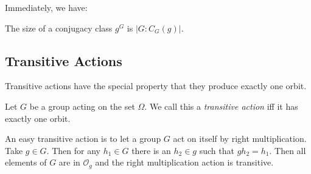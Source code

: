\documentclass[main.tex]{subfiles}
\begin{document}
Immediately, we have:

\begin{corollary}
The size of a conjugacy class $g^G$ is $|G : C_G(g)|$.
\end{corollary}


\subsection{Transitive Actions}

Transitive actions have the special property that they produce exactly one orbit.

\begin{definition}
Let $G$ be a group acting on the set $\Omega$. We call this a \emph{transitive action} iff it has exactly one orbit.
\end{definition}

An easy transitive action is to let a group $G$ act on itself by right multiplication. Take $g \in G$. Then for any $h_1 \in G$ there is an $h_2 \in g$ such that $g h_2 = h_1$. Then all elements of $G$ are in $\mathcal{O}_g$ and the right multiplication action is transitive.
\end{document}
